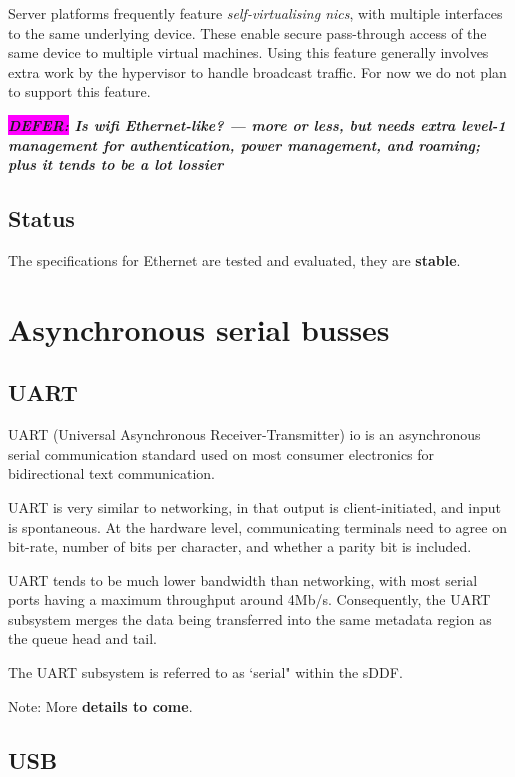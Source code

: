 \documentclass[a4paper,12pt]{report}
\newcommand{\DEFER}[1]{\textbf{\textsl{\colorbox{magenta}{DEFER:} #1}}}
\newcommand{\DEFER}[1]{\relax}
\begin{document}
Server platforms frequently feature \emph{self-virtualising
  \glspl{nic}}, with multiple interfaces to the same underlying
device. These enable secure pass-through access of the same device to
multiple virtual machines.  Using this feature generally involves
extra work by the hypervisor to handle broadcast traffic. For now we
do not plan to support this feature.

\DEFER{Is wifi Ethernet-like? --- more or less, but needs extra
  level-1 management for authentication, power management, and
  roaming; plus it tends to be a lot lossier}

\subsection{Status}

The specifications for Ethernet are tested and evaluated, they are
\textbf{stable}.

\section{Asynchronous serial busses}\label{s:cl-serial}

\subsection{UART}

UART (Universal Asynchronous Receiver-Transmitter) \gls{io} is an asynchronous
serial communication standard used on most consumer electronics for bidirectional
text communication.

UART is very similar to networking, in that output is
client-initiated, and input is spontaneous.  At the hardware level,
communicating terminals need to agree on bit-rate, number of bits per
character, and whether a parity bit is included.

UART tends to be much lower bandwidth than networking, with most serial
ports having a maximum throughput around 4Mb/s. Consequently, the UART
subsystem merges the data being transferred into the same metadata region
as the queue head and tail.

The UART subsystem is referred to as `serial" within the sDDF.

Note: More \textbf{details to come}.

\subsection{USB}\label{s:cl-usb}
\end{document}
